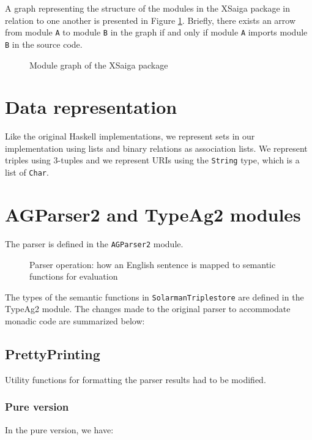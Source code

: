 \documentclass[../main.tex]{subfiles}
\begin{document}
A graph representing the structure of the modules in the XSaiga package in relation to one another is presented in Figure \ref{fig:modulegraph}.  Briefly, there exists an arrow from module \texttt{A} to module \texttt{B} in the graph if and only if module \texttt{A} imports module \texttt{B} in the source code.

\begin{figure}[h]
	\centering
	\caption{Module graph of the XSaiga package}
	\label{fig:modulegraph}
\end{figure}

\section{Data representation}

Like the original Haskell implementations, we represent sets in our implementation using lists and binary relations as association lists.  We represent triples using 3-tuples and we represent URIs using the \texttt{String} type, which is a list of \texttt{Char}.


\section{AGParser2 and TypeAg2 modules}

The parser is defined in the \texttt{AGParser2} module.

\begin{figure}[h]
	\centering
	\caption{Parser operation: how an English sentence is mapped to semantic functions for evaluation \cite{graphmqslide}}
\end{figure}

The types of the semantic functions in \texttt{SolarmanTriplestore} are defined in the TypeAg2 module.
The changes made to the original parser to accommodate monadic code are summarized below:

\subsection{PrettyPrinting}
Utility functions for formatting the parser results had to be modified.

\subsubsection{Pure version}
In the pure version, we have:
\end{document}
